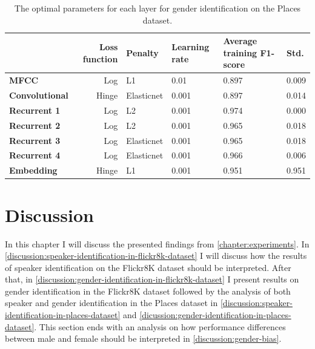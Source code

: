 \documentclass[a4paper, oneside]{book}
\begin{document}
\begin{table}[H]
\begin{center}
\begin{tabular}{|l|r|l|l|l|l|}
\hline              & \bf Loss function     & \bf Penalty   & \bf Learning rate & \bf Average training F1-score     & \bf Std. \\ \hline
\bf MFCC            &  Log                  & L1            & 0.01              & 0.897                             & 0.009 \\
\bf Convolutional   &  Hinge                & Elasticnet    & 0.001             & 0.897                             & 0.014 \\ 
\bf Recurrent 1     &  Log                  & L2            & 0.001             & 0.974                             & 0.000 \\
\bf Recurrent 2     &  Log                  & L2            & 0.001             & 0.965                             & 0.018 \\
\bf Recurrent 3     &  Log                  & Elasticnet    & 0.001             & 0.965                             & 0.018 \\
\bf Recurrent 4     &  Log                  & Elasticnet    & 0.001             & 0.966                             & 0.006 \\
\bf Embedding       &  Hinge                & L1            & 0.001             & 0.951                             & 0.951 \\
\hline
\end{tabular}
\end{center}
\caption{\label{table:gender-identification-on-places-dataset} The optimal parameters for each layer for gender identification on the Places dataset.  }
\end{table}

\newpage

\chapter{Discussion}\label{experiments:discussion}

In this chapter I will discuss the presented findings from \autoref{chapter:experiments}. In \autoref{discussion:speaker-identification-in-flickr8k-dataset} I will discuss how the results of speaker identification on the Flickr8K dataset should be interpreted. After that, in \autoref{discussion:gender-identification-in-flickr8k-dataset} I present results on gender identification in the Flickr8K dataset followed by the analysis of both speaker and gender identification in the Places dataset in \autoref{discussion:speaker-identification-in-places-dataset} and \autoref{dicussion:gender-identification-in-places-dataset}. This section ends with an analysis on how performance differences between male and female should be interpreted in \autoref{discussion:gender-bias}.
\end{document}
